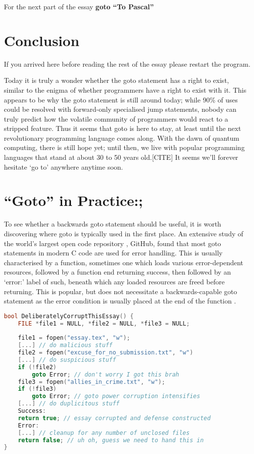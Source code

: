 \documentclass{journal}
\begin{document}
For the next part of the essay \textbf{goto ``To Pascal''}

\section{Conclusion}
If you arrived here before reading the rest of the essay please restart the program.

Today it is truly a wonder whether the goto statement has a right to exist, similar to the enigma of whether programmers have a right to exist with it. This appears to be why the goto statement is still around today; while 90\% of uses could be resolved with forward-only specialised jump statements, nobody can truly predict how the volatile community of programmers would react to a stripped feature. Thus it seems that goto is here to stay, at least until the next revolutionary programming language comes along. With the dawn of quantum computing, there is still hope yet; until then, we live with popular programming languages that stand at about 30 to 50 years old.[CITE] It seems we'll forever hesitate `go to' anywhere anytime soon.

\section{``Goto'' in Practice:;}
To see whether a backwards goto statement should be useful, it is worth discovering where goto is typically used in the first place. An extensive study \cite{gotostudy} of the world's largest open code repository \cite{github}, GitHub, found that most goto statements in modern C code are used for error handling. This is usually characterised by a function, sometimes one which loads various error-dependent resources, followed by a function end returning success, then followed by an `error:' label of such, beneath which any loaded resources are freed before returning. This is popular, but does not necessitate a backwards-capable goto statement as the error condition is usually placed at the end of the function \cite{gotostudy}.

\begin{lstlisting}[language=C++,caption={An example of goto used for error handling (C++)}]
bool DeliberatelyCorruptThisEssay() {
	FILE *file1 = NULL, *file2 = NULL, *file3 = NULL;
	
	file1 = fopen("essay.tex", "w");
	[...] // do malicious stuff
	file2 = fopen("excuse_for_no_submission.txt", "w")
	[...] // do suspicious stuff
	if (!file2)
		goto Error; // don't worry I got this brah
	file3 = fopen("allies_in_crime.txt", "w");
	if (!file3)
		goto Error; // goto power corruption intensifies
	[...] // do duplicitous stuff
	Success:
	return true; // essay corrupted and defense constructed
	Error:
	[...] // cleanup for any number of unclosed files
	return false; // uh oh, guess we need to hand this in
}
\end{lstlisting}
\end{document}
